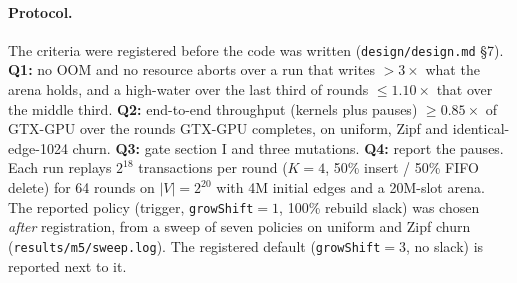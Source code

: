 \documentclass[sigconf,nonacm]{acmart}
\newcommand{\sys}{GTX-GPU}
\newcommand{\code}[1]{\texttt{#1}}
\begin{document}
\paragraph{Protocol.} The criteria were registered before the code was written
(\code{design/design.md} \S7). \textbf{Q1:} no OOM and no resource aborts over a run that writes $>3\times$ what the
arena holds, and a high-water over the last third of rounds $\le 1.10\times$ that over the middle third. \textbf{Q2:}
end-to-end throughput (kernels plus pauses) $\ge 0.85\times$ of \sys{} over the rounds \sys{} completes, on uniform,
Zipf and identical-edge-1024 churn. \textbf{Q3:} gate section I and three mutations. \textbf{Q4:} report the pauses.
Each run replays $2^{18}$ transactions per round ($K{=}4$, 50\% insert / 50\% FIFO delete) for 64 rounds on
$|V|{=}2^{20}$ with 4M initial edges and a 20M-slot arena. The reported policy (trigger, \code{growShift}${=}1$,
100\% rebuild slack) was chosen \emph{after} registration, from a sweep of seven policies on uniform and Zipf churn
(\code{results/m5/sweep.log}). The registered default (\code{growShift}${=}3$, no slack) is reported next to it.
\end{document}
